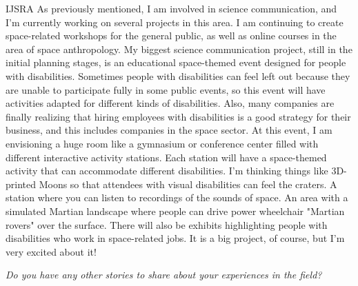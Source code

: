 \begin{labeling}{IJSRA}
	As previously mentioned, I am involved in science communication, and I’m currently working on several projects in this area. I am continuing to create space-related workshops for the general public, as well as online courses in the area of space anthropology. My biggest science communication project, still in the initial planning stages, is an educational space-themed event designed for people with disabilities. Sometimes people with disabilities can feel left out because they are unable to participate fully in some public events, so this event will have activities adapted for different kinds of disabilities. Also, many companies are finally realizing that hiring employees with disabilities is a good strategy for their business, and this includes companies in the space sector. At this event, I am envisioning a huge room like a gymnasium or conference center filled with different interactive activity stations. Each station will have a space-themed activity that can accommodate different disabilities. I'm thinking things like 3D-printed Moons so that attendees with visual disabilities can feel the craters. A station where you can listen to recordings of the sounds of space. An area with a simulated Martian landscape where people can drive power wheelchair "Martian rovers" over the surface. There will also be exhibits highlighting people with disabilities who work in space-related jobs. It is a big project, of course, but I’m very excited about it!

	\item[IJSRA] \emph{Do you have any other stories to share about your experiences in the field?}


\end{labeling}
